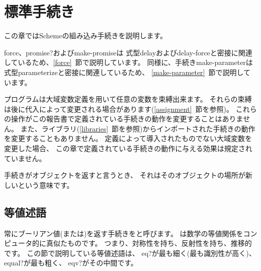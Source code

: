 
\chapter{標準手続き}
\label{initialenv}
\label{builtinchapter}


この章ではSchemeの組み込み手続きを説明します。

{\cf force}、{\cf promise?}および{\cf make-promise}は
式型{\cf delay}および{\cf delay-force}と密接に関連しているため、\ref{force}~節で説明しています。
同様に、手続き{\cf make-parameter}は式型{\cf parameterize}と密接に関連しているため、
\ref{make-parameter}~節で説明しています。

プログラムは大域変数定義を用いて任意の変数を束縛出来ます。
それらの束縛は後に代入によって変更される場合があります(\ref{assignment}~節を参照)。
これらの操作がこの報告書で定義されている手続きの動作を変更することはありません。
また、ライブラリ(\ref{libraries}~節を参照)からインポートされた手続きの動作を変更することもありません。
定義によって導入されたものでない大域変数を変更した場合、
この章で定義されている手続きの動作に与える効果は規定されていません。

手続きがオブジェクトを返すと言うとき、
それはそのオブジェクトの場所が新しいという意味です。

\section{等値述語}
\label{equivalencesection}

常にブーリアン値(\schtrue{}または\schfalse)を返す手続きをと呼びます。
は数学の等値関係をコンピュータ的に真似たものです。
つまり、対称性を持ち、反射性を持ち、推移的です。
この節で説明している等値述語は、
{\cf eq?}が最も細く(最も識別性が高く)、
{\cf equal?}が最も粗く、
{\cf eqv?}がその中間です。


